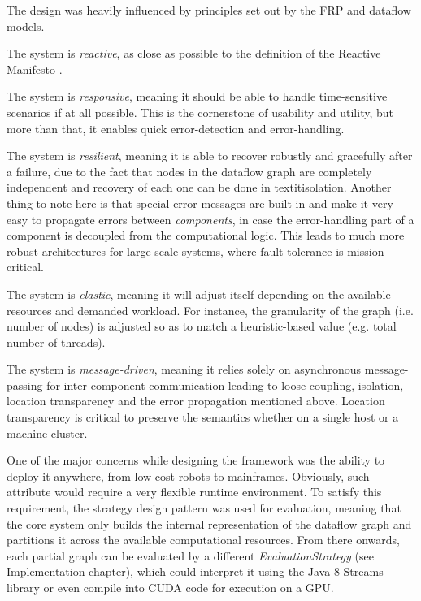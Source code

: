 \documentclass{dithesis}
\begin{document}
The design was heavily influenced by principles set out by the FRP and dataflow models. 


The system is \textit{reactive}, as close as possible to the definition of the Reactive Manifesto \cite{manifesto}. 

The system is \textit{responsive}, meaning it should be able to handle time-sensitive scenarios if at all possible. This is the cornerstone of usability and utility, but more than that, it enables quick error-detection and error-handling.

The system is \textit{resilient}, meaning it is able to recover robustly and gracefully after a failure, due to the fact that nodes in the dataflow graph are completely independent and recovery of each one can be done in textit{isolation}. Another thing to note here is that special error messages are built-in and make it very easy to propagate errors between \textit{components}, in case the error-handling part of a component is decoupled from the computational logic. This leads to much more robust architectures for large-scale systems, where fault-tolerance is mission-critical.

The system is \textit{elastic}, meaning it will adjust itself depending on the available resources and demanded workload. For instance, the granularity of the graph (i.e. number of nodes) is adjusted so as to match a heuristic-based value (e.g. total number of threads).

The system is \textit{message-driven}, meaning it relies solely on asynchronous message-passing for inter-component communication leading to loose coupling, isolation, location transparency and the error propagation mentioned above. Location transparency is critical to preserve the semantics whether on a single host or a machine cluster. 



One of the major concerns while designing the framework was the ability to deploy it anywhere, from low-cost robots to mainframes. Obviously, such attribute would require a very flexible runtime environment. To satisfy this requirement, the strategy design pattern was used for evaluation, meaning that the core system only builds the internal representation of the dataflow graph and partitions it across the available computational resources. From there onwards, each partial graph can be evaluated by a different \textit{EvaluationStrategy} (see Implementation chapter), which could interpret it using the Java 8 Streams library or even compile into CUDA code for execution on a GPU.
\end{document}
